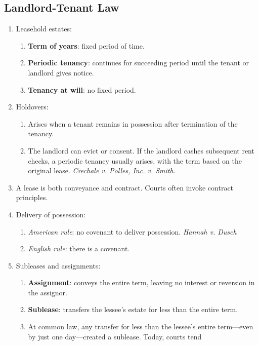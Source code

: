 \subsection{Landlord-Tenant Law}

\begin{enumerate}
    \item Leasehold estates:
    \begin{enumerate}
        \item \textbf{Term of years}: fixed period of time.
        \item \textbf{Periodic tenancy}: continues for succeeding period until 
        the tenant or landlord gives notice.
        \item \textbf{Tenancy at will}: no fixed period.
    \end{enumerate}
    \item Holdovers:
    \begin{enumerate}
        \item Arises when a tenant remains in possession after termination of 
        the tenancy.
        \item The landlord can evict or consent. If the landlord cashes 
        subsequent rent checks, a periodic tenancy usually arises, with the 
        term based on the original lease. \emph{Crechale v. Polles, Inc. v. 
        Smith}.
    \end{enumerate}
    \item A lease is both conveyance and contract. Courts often invoke 
    contract principles.
    \item Delivery of possession:
    \begin{enumerate}
        \item \emph{American rule}: no covenant to deliver possession. 
        \emph{Hannah v. Dusch}
        \item \emph{English rule}: there is a covenant.
    \end{enumerate}
    \item Subleases and assignments:
    \begin{enumerate}
        \item \textbf{Assignment}: conveys the entire term, leaving no 
        interest or reversion in the assignor.
        \item \textbf{Sublease}: transfers the lessee's estate for less than 
        the entire term.
        \item At common law, any transfer for less than the lessee's entire 
        term---even by just one day---created a sublease. Today, courts tend 

\end{enumerate}
\end{enumerate}
